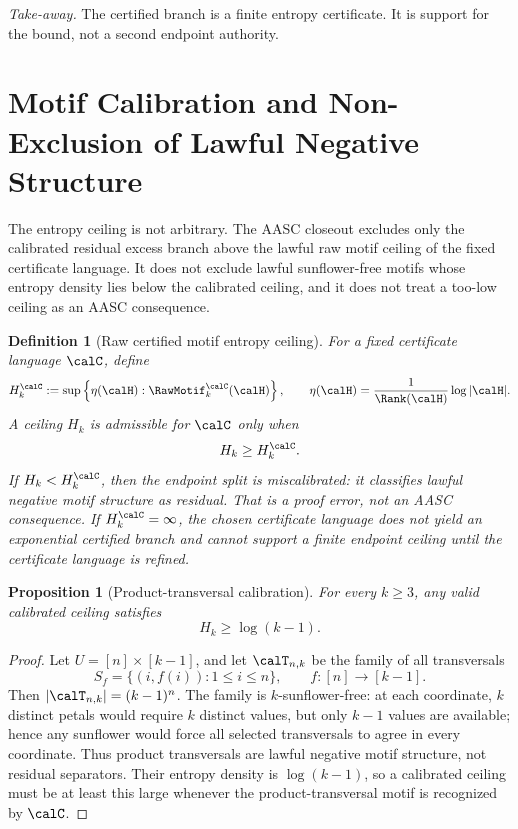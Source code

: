 \documentclass[11pt]{article}
\newtheorem{proposition}[theorem]{Proposition}
\newtheorem{definition}[theorem]{Definition}
\begin{document}
\noindent\emph{Take-away.} The certified branch is a finite entropy certificate.  It is support for the bound, not a second endpoint authority.

\section{Motif Calibration and Non-Exclusion of Lawful Negative Structure}

The entropy ceiling is not arbitrary.  The AASC closeout excludes only the calibrated residual excess branch above the lawful raw motif ceiling of the fixed certificate language.  It does not exclude lawful sunflower-free motifs whose entropy density lies below the calibrated ceiling, and it does not treat a too-low ceiling as an AASC consequence.

\begin{definition}[Raw certified motif entropy ceiling]
For a fixed certificate language \(\calC\), define
\[
  H_k^{\calC}
  :=
  \sup\left\{
  \eta(\calH):
  \RawMotif^{\calC}_{k}(\calH)
  \right\},
  \qquad
  \eta(\calH)=\frac1{\Rank(\calH)}\log|\calH|.
\]
A ceiling \(H_k\) is admissible for \(\calC\) only when
\[
  H_k\ge H_k^{\calC}.
\]
If \(H_k<H_k^{\calC}\), then the endpoint split is miscalibrated: it classifies lawful negative motif structure as residual.  That is a proof error, not an AASC consequence.  If \(H_k^{\calC}=\infty\), the chosen certificate language does not yield an exponential certified branch and cannot support a finite endpoint ceiling until the certificate language is refined.
\end{definition}

\begin{proposition}[Product-transversal calibration]
For every \(k\ge3\), any valid calibrated ceiling satisfies
\[
  H_k\ge \log(k-1).
\]
\end{proposition}

\begin{proof}
Let \(U=[n]\times[k-1]\), and let \(\calT_{n,k}\) be the family of all transversals
\[
  S_f=\{(i,f(i)):1\le i\le n\},\qquad f:[n]\to[k-1].
\]
Then \(|\calT_{n,k}|=(k-1)^n\).  The family is \(k\)-sunflower-free: at each coordinate, \(k\) distinct petals would require \(k\) distinct values, but only \(k-1\) values are available; hence any sunflower would force all selected transversals to agree in every coordinate.  Thus product transversals are lawful negative motif structure, not residual separators.  Their entropy density is \(\log(k-1)\), so a calibrated ceiling must be at least this large whenever the product-transversal motif is recognized by \(\calC\).
\end{proof}
\end{document}
